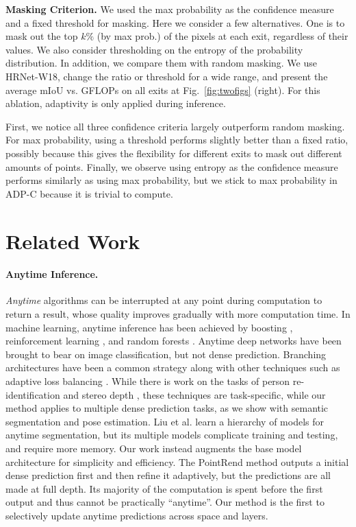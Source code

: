 \documentclass{article} %
\renewcommand{\cite}{\citep}
\begin{document}
\vspace{1ex}
\noindent\textbf{Masking Criterion.}
We used the max probability as the confidence measure and a fixed threshold for masking.
Here we consider a few alternatives.
One is to mask out the top $k\%$ (by max prob.) of the pixels at each exit, regardless of their values.
We also consider thresholding on the entropy of the probability distribution.
In addition, we compare them with random masking.
We use HRNet-W18, change the ratio or threshold for a wide range, and present the average mIoU vs. GFLOPs on all exits at Fig.~\ref{fig:twofigs} (right). 
For this ablation, adaptivity is only applied during inference.


First, we notice all three confidence criteria largely outperform random masking.
For max probability, using a threshold performs slightly better than a fixed ratio, possibly because this gives the flexibility for different exits to mask out different amounts of points.
Finally, we observe using entropy as the confidence measure performs similarly as using max probability, but we stick to max probability in ADP-C because it is trivial to compute.

\section{Related Work}
\paragraph{Anytime Inference.} 
\emph{Anytime} algorithms \cite{zilberstein1996using,dean1988analysis} can be interrupted at any point during computation to return a result, whose quality improves gradually with more computation time.
In machine learning, anytime inference has been achieved by boosting \cite{grubb2012speedboost}, reinforcement learning \cite{karayev2014anytime}, and random forests \cite{frohlich2012time}.
Anytime deep networks have been brought to bear on image classification, but not dense prediction.
Branching architectures have been a common strategy \cite{amthor2016impatient,teerapittayanon2016branchynet} along with other techniques such as
adaptive loss balancing \cite{hu2019learning}.
While there is work on the tasks of person re-identification \cite{wang2019anytime} and stereo depth \cite{wang2018resource}, these techniques are task-specific, while our method applies to multiple dense prediction tasks, as we show with semantic segmentation and pose estimation.
Liu et al. \cite{liu2016learning} learn a hierarchy of models for anytime segmentation, but its multiple models complicate training and testing, and require more memory. 
Our work instead augments the base model architecture for simplicity and efficiency. The PointRend method \cite{kirillov2020pointrend} outputs a initial dense prediction first and then refine it adaptively, but the predictions are all made at full depth. Its majority of the computation is spent before the first output and thus cannot be practically ``anytime''.
Our method is the first to selectively update anytime predictions across space and layers.
\end{document}
